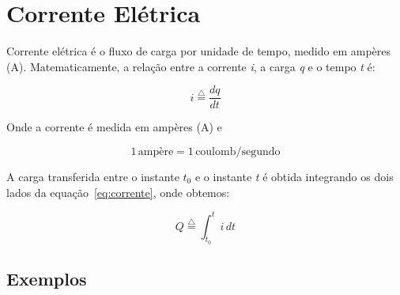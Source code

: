 \section{Corrente Elétrica}

Corrente elétrica é o fluxo de carga por unidade de tempo, medido em ampères
(A). Matematicamente, a relação entre a corrente \textit{i}, a carga \textit{q}
e o tempo \textit{t} é:

\begin{equation}
	\label{eq:corrente}
	i \overset{\triangle}{=} \frac{dq}{dt}
\end{equation}

Onde a corrente é medida em ampères (A) e

\[
	1\,\text{ampère} = 1\,\text{coulomb}/\text{segundo}
\]

A carga transferida entre o instante \textit{\( t_0 \)} e o instante \textit{t} é
obtida integrando os dois lados da equação~\ref{eq:corrente}, onde obtemos:

\begin{equation}
	\label{eq:carga-eletrica}
	Q \overset{\triangle}{=} \int_{t_0}^{t} i\,dt
\end{equation}

\subsection{\textbf{Exemplos}}

